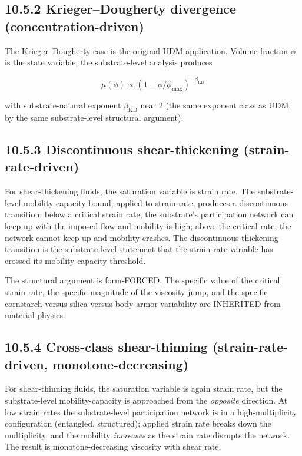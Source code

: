 \documentclass[11pt]{book}
\begin{document}
\subsection{10.5.2 Krieger–Dougherty divergence (concentration-driven)}

The Krieger–Dougherty case is the original UDM application. Volume fraction $\phi$ is the state variable; the substrate-level analysis produces

\[
\mu(\phi) \propto \left(1 - \phi/\phi_\mathrm{max}\right)^{-\beta_\mathrm{KD}}
\]

with substrate-natural exponent $\beta_\mathrm{KD}$ near 2 (the same exponent class as UDM, by the same substrate-level structural argument).

\subsection{10.5.3 Discontinuous shear-thickening (strain-rate-driven)}

For shear-thickening fluids, the saturation variable is strain rate. The substrate-level mobility-capacity bound, applied to strain rate, produces a discontinuous transition: below a critical strain rate, the substrate's participation network can keep up with the imposed flow and mobility is high; above the critical rate, the network cannot keep up and mobility crashes. The discontinuous-thickening transition is the substrate-level statement that the strain-rate variable has crossed its mobility-capacity threshold.

The structural argument is form-FORCED. The specific value of the critical strain rate, the specific magnitude of the viscosity jump, and the specific cornstarch-versus-silica-versus-body-armor variability are INHERITED from material physics.

\subsection{10.5.4 Cross-class shear-thinning (strain-rate-driven, monotone-decreasing)}

For shear-thinning fluids, the saturation variable is again strain rate, but the substrate-level mobility-capacity is approached from the \textit{opposite} direction. At low strain rates the substrate-level participation network is in a high-multiplicity configuration (entangled, structured); applied strain rate breaks down the multiplicity, and the mobility \textit{increases} as the strain rate disrupts the network. The result is monotone-decreasing viscosity with shear rate.
\end{document}
